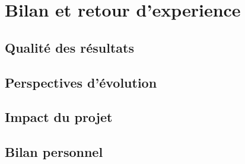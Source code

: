 \chapter{Bilan et retour d'experience}

	\section{Qualité des résultats}
	

	\section{Perspectives d'évolution}
	

	\section{Impact du projet}
	
	
	\section{Bilan personnel}
	
